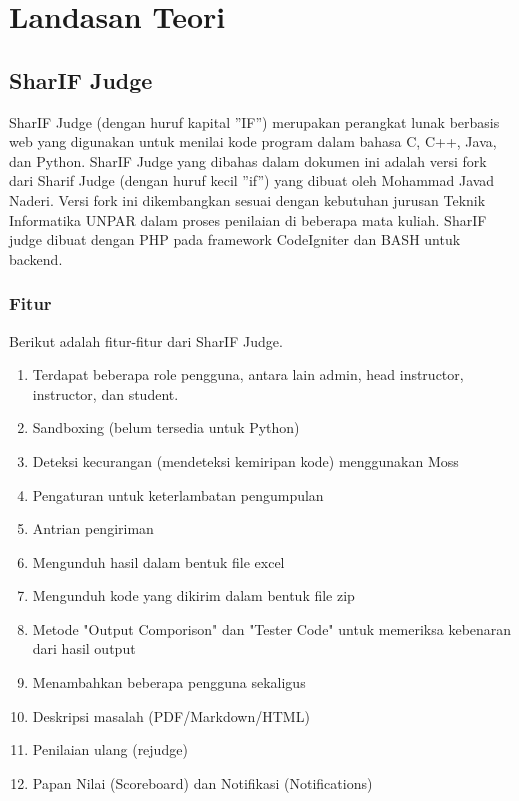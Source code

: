 \chapter{Landasan Teori}
\label{chap:teori}

\section{SharIF Judge}
\label{sec:sharifjudge} 
 
SharIF Judge \cite{SharIF_Judge} (dengan huruf kapital ''IF'') merupakan perangkat lunak berbasis web yang digunakan untuk menilai kode program dalam bahasa C, C++, Java, dan Python. SharIF Judge yang dibahas dalam dokumen ini adalah versi fork dari Sharif Judge \cite{Sharif_Judge_Original} (dengan huruf kecil ''if'') yang dibuat oleh Mohammad Javad Naderi. Versi fork ini dikembangkan sesuai dengan kebutuhan jurusan Teknik Informatika UNPAR dalam proses penilaian di beberapa mata kuliah. SharIF judge dibuat dengan PHP pada framework CodeIgniter dan BASH untuk backend.

\subsection{Fitur}
Berikut adalah fitur-fitur dari SharIF Judge.
\begin{enumerate}
	\item  Terdapat beberapa role pengguna, antara lain admin, head instructor, instructor, dan student.
	\item  Sandboxing (belum tersedia untuk Python)
	\item Deteksi kecurangan (mendeteksi kemiripan kode) menggunakan Moss
	\item Pengaturan untuk keterlambatan pengumpulan
	\item Antrian pengiriman
	\item Mengunduh hasil dalam bentuk file excel
	\item Mengunduh kode yang dikirim dalam bentuk file zip
	\item Metode "Output Comporison" dan "Tester Code" untuk memeriksa kebenaran dari hasil output
	\item Menambahkan beberapa pengguna sekaligus
	\item Deskripsi masalah (PDF/Markdown/HTML)
	\item Penilaian ulang (rejudge)
	\item Papan Nilai (Scoreboard) dan Notifikasi (Notifications)
	
\end{enumerate}


